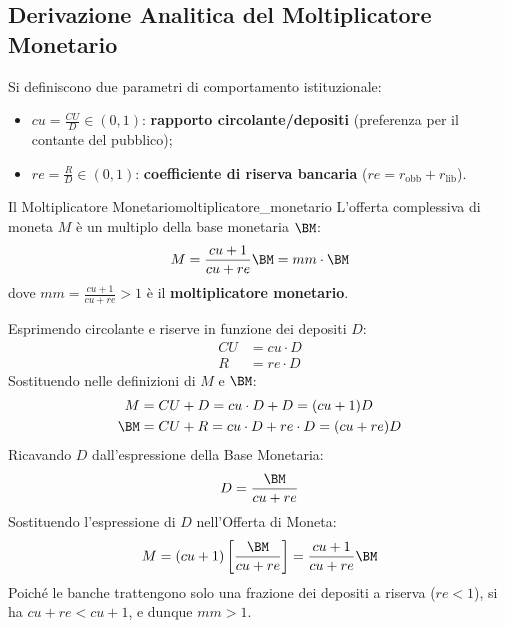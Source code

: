 \subsection{Derivazione Analitica del Moltiplicatore Monetario}

Si definiscono due parametri di comportamento istituzionale:
\begin{itemize}
    \item $cu = \frac{CU}{D} \in (0, 1)$: \textbf{rapporto circolante/depositi} (preferenza per il contante del pubblico);
    \item $re = \frac{R}{D} \in (0, 1)$: \textbf{coefficiente di riserva bancaria} ($re = r_{\text{obb}} + r_{\text{lib}}$).
\end{itemize}

\begin{teorema}{Il Moltiplicatore Monetario}{moltiplicatore_monetario}
L'offerta complessiva di moneta $M$ è un multiplo della base monetaria $\BM$:
\begin{equation}
    M = \frac{cu + 1}{cu + re} \BM = mm \cdot \BM
\end{equation}
dove $mm = \frac{cu + 1}{cu + re} > 1$ è il \textbf{moltiplicatore monetario}.
\end{teorema}

\begin{dimostrazione}
Esprimendo circolante e riserve in funzione dei depositi $D$:
\begin{align}
    CU &= cu \cdot D \\
    R &= re \cdot D
\end{align}
Sostituendo nelle definizioni di $M$ e $\BM$:
\begin{align}
    M &= CU + D = cu \cdot D + D = (cu + 1) D \\
    \BM &= CU + R = cu \cdot D + re \cdot D = (cu + re) D
\end{align}
Ricavando $D$ dall'espressione della Base Monetaria:
\begin{equation}
    D = \frac{\BM}{cu + re}
\end{equation}
Sostituendo l'espressione di $D$ nell'Offerta di Moneta:
\begin{equation}
    M = (cu + 1) \left[ \frac{\BM}{cu + re} \right] = \frac{cu + 1}{cu + re} \BM
\end{equation}
Poiché le banche trattengono solo una frazione dei depositi a riserva ($re < 1$), si ha $cu + re < cu + 1$, e dunque $mm > 1$.
\end{dimostrazione}

